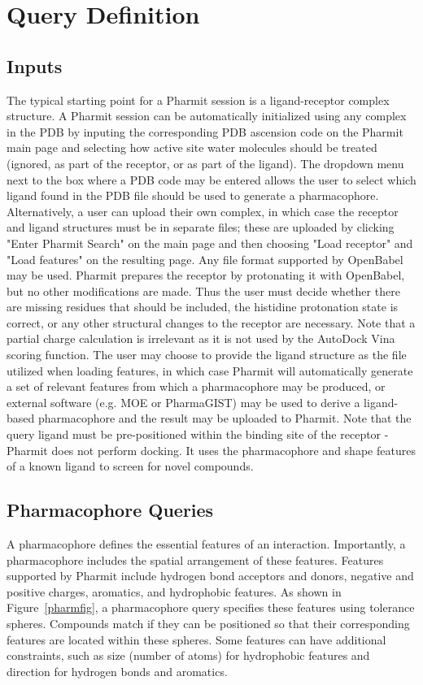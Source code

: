 \section{Query Definition}


\subsection{Inputs}

The typical starting point for a Pharmit session is a ligand-receptor complex structure. A Pharmit session can be automatically initialized using any complex in the PDB by inputing the corresponding PDB ascension code on the Pharmit main page and selecting how active site water molecules should be treated (ignored, as part of the receptor, or as part of the ligand).  The dropdown menu next to the box where a PDB code may be entered allows the user to select which ligand found in the PDB file should be used to generate a pharmacophore.  Alternatively, a user can upload their own complex, in which case the receptor and ligand structures must be in separate files; these are uploaded by clicking "Enter Pharmit Search" on the main page and then choosing "Load receptor" and "Load features" on the resulting page. Any file format supported by OpenBabel \cite{O_Boyle_2011} may be used.  Pharmit prepares the receptor by protonating it with OpenBabel, but no other modifications are made. Thus the user must decide whether there are missing residues that should be included, the histidine protonation state is correct, or any other structural changes to the receptor are necessary.  Note that a partial charge calculation is irrelevant as it is not used by the AutoDock Vina scoring function.  The user may choose to provide the ligand structure as the file utilized when loading features, in which case Pharmit will automatically generate a set of relevant features from which a pharmacophore may be produced, or external software (e.g. MOE or PharmaGIST) may be used to derive a ligand-based pharmacophore and the result may be uploaded to Pharmit.  Note that the query ligand must be pre-positioned within the binding site of the receptor - Pharmit does not perform docking. It uses the pharmacophore and shape features of a known ligand to screen for novel compounds.

\subsection{Pharmacophore Queries}
A pharmacophore \cite{Koes_2015rev,Yang_2010,Leach_2010} defines the essential features of an interaction. Importantly, a pharmacophore includes the spatial arrangement of these features. 
Features supported by Pharmit include hydrogen bond acceptors and donors,  negative and positive charges, aromatics, and hydrophobic features.
As shown in Figure~\ref{pharmfig}, a pharmacophore query specifies these features using tolerance spheres.  Compounds match if they can be positioned so that their corresponding features are located within these spheres. Some features can have additional constraints, such as size (number of atoms) for hydrophobic features and direction for hydrogen bonds and aromatics.

